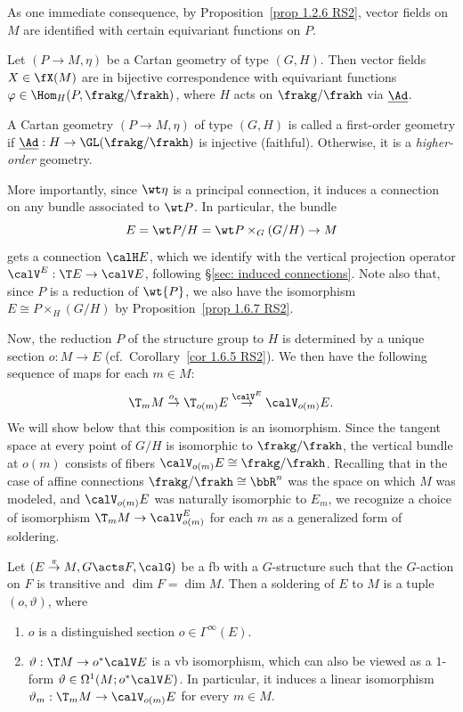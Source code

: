 As one immediate consequence, by Proposition~\ref{prop 1.2.6 RS2}, vector fields on $M$ are identified with certain equivariant functions on $P$.
\begin{cor}
    Let $(P\to M,\eta)$ be a Cartan geometry of type $(G,H)$. Then vector fields $X\in \fX(M)$ are in bijective correspondence with equivariant functions $\varphi\in\Hom_H(P,\frakg\slash\frakh)$, where $H$ acts on $\frakg\slash\frakh$ via $\underline{\Ad}$.
\end{cor}

\begin{defn}
    A Cartan geometry $(P\to M,\eta)$ of type $(G,H)$ is called a first-order geometry if $\underline{\Ad}:H\to \GL(\frakg\slash\frakh)$ is injective (faithful). Otherwise, it is a \emph{higher-order} geometry.
\end{defn}

More importantly, since $\wt\eta$ is a principal connection, it induces a connection on any bundle associated to $\wt P$. In particular, the bundle 
\[E=\wt P\slash H=\wt P\times_G (G\slash H)\to M\] gets a connection $\calH E$, which we identify with the vertical projection operator $\calV^E:\T E\to \calV E$, following \S\ref{sec: induced connections}. 
Note also that, since $P$ is a reduction of $\wt{P}$, we also have the isomorphism $E\cong P\times_H (G\slash H)$ by Proposition~\ref{prop 1.6.7 RS2}.

Now, the reduction $P$ of the structure group to $H$ is determined by a unique section $o:M\to E$ (cf.\ Corollary~\ref{cor 1.6.5 RS2}). We then have the following sequence of maps for each $m\in M$:
\[\T_mM\overset{o_{\ast}}{\to}\T_{o(m)}E\overset{\calV^E}{\to}\calV_{o(m)}E.\]
We will show below that this composition is an isomorphism. Since the tangent space at every point of $G\slash H$ is isomorphic to $\frakg\slash\frakh$, the vertical bundle at $o(m)$ consists of fibers $\calV_{o(m)}E\cong \frakg\slash\frakh$.  Recalling that in the case of affine connections $\frakg\slash\frakh\cong\bbR^n$ was the space on which $M$ was modeled, and $\calV_{o(m)}E$ was naturally isomorphic to $E_m$, we recognize a choice of isomorphism $\T_mM\to \calV^E_{o(m)}$ for each $m$ as a generalized form of soldering.

\begin{defn}\label{def soldering of E to M}
    Let $(E\overset{\pi}{\to}M,G\acts F,\calG)$ be a \gls{fb} with a $G$-structure such that the $G$-action on $F$ is transitive and $\dim F=\dim M$. Then a soldering of $E$ to $M$ is a tuple $(o,\vartheta)$, where
    \begin{enumerate}
        \item $o$ is a distinguished section $o\in\Gamma^\infty(E)$.
        \item $\vartheta:\T M\to o^\ast\calV E$ is a \gls{vb} isomorphism, which can also be viewed as a $1$-form $\vartheta\in \Omega^1(M;o^\ast \calV E)$. In particular, it induces a linear isomorphism $\vartheta_m:\T_m M\to \calV_{o(m)}E$ for every $m\in M$.
    \end{enumerate}
\end{defn}

